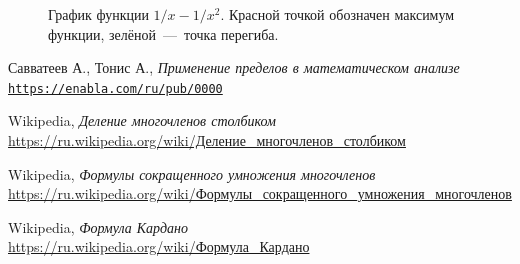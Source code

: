 \documentclass[12pt]{article}
\begin{document}
\begin{figure}[htbp]
	\centering
	\caption{График функции ${1}/{x} - {1}/{x^2}$. Красной точкой обозначен максимум функции, зелёной~\----~точка перегиба.}
	\label{fig:75}
\end{figure}
\begin{thebibliography}{9}
	Савватеев А., Тонис А., \textit{Применение пределов в математическом анализе}
	\\\texttt{\url{https://enabla.com/ru/pub/0000}}
	
	Wikipedia, \textit{Деление многочленов столбиком}
	\\\href{https://ru.wikipedia.org/wiki/\%D0\%94\%D0\%B5\%D0\%BB\%D0\%B5\%D0\%BD\%D0\%B8\%D0\%B5_\%D0\%BC\%D0\%BD\%D0\%BE\%D0\%B3\%D0\%BE\%D1\%87\%D0\%BB\%D0\%B5\%D0\%BD\%D0\%BE\%D0\%B2_\%D1\%81\%D1\%82\%D0\%BE\%D0\%BB\%D0\%B1\%D0\%B8\%D0\%BA\%D0\%BE\%D0\%BC}{https://ru.wikipedia.org/wiki/Деление\_многочленов\_столбиком}

	Wikipedia, \textit{Формулы сокращенного умножения многочленов}
	\\\href{https://ru.wikipedia.org/wiki/\%D0\%A4\%D0\%BE\%D1\%80\%D0\%BC\%D1\%83\%D0\%BB\%D1\%8B\_\%D1\%81\%D0\%BE\%D0\%BA\%D1\%80\%D0\%B0\%D1\%89\%D1\%91\%D0\%BD\%D0\%BD\%D0\%BE\%D0\%B3\%D0\%BE\_\%D1\%83\%D0\%BC\%D0\%BD\%D0\%BE\%D0\%B6\%D0\%B5\%D0\%BD\%D0\%B8\%D1\%8F\_\%D0\%BC\%D0\%BD\%D0\%BE\%D0\%B3\%D0\%BE\%D1\%87\%D0\%BB\%D0\%B5\%D0\%BD\%D0\%BE\%D0\%B2}{https://ru.wikipedia.org/wiki/Формулы\_сокращенного\_умножения\_многочленов}

	Wikipedia, \textit{Формула Кардано}
	\\\href{https://ru.wikipedia.org/wiki/\%D0\%A4\%D0\%BE\%D1\%80\%D0\%BC\%D1\%83\%D0\%BB\%D0\%B0\_\%D0\%9A\%D0\%B0\%D1\%80\%D0\%B4\%D0\%B0\%D0\%BD\%D0\%BE}{https://ru.wikipedia.org/wiki/Формула\_Кардано}
\end{thebibliography}
\end{document}
